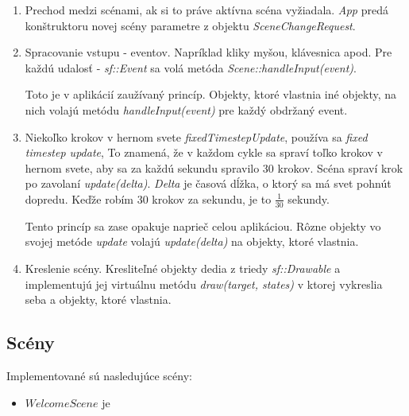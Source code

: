 \documentclass[12pt]{article}
\begin{document}
\begin{enumerate}
    \item Prechod medzi scénami, ak si to práve aktívna scéna vyžiadala. \emph{App} predá
    konštruktoru novej scény parametre z objektu \emph{SceneChangeRequest}.
    \item Spracovanie vstupu - eventov. Napríklad kliky myšou, klávesnica apod.
    Pre každú udalosť - \emph{sf::Event} sa volá metóda \emph{Scene::handleInput(event)}.
    

    Toto je v aplikácií zaužívaný princíp. Objekty, ktoré vlastnia iné objekty,
    na nich volajú metódu \emph{handleInput(event)} pre každý obdržaný event.
    \item Niekoľko krokov v hernom svete \emph{fixedTimestepUpdate}, používa sa \emph{fixed timestep update},
    To znamená, že v každom cykle sa spraví toľko krokov v hernom svete, aby sa za každú sekundu spravilo 30 krokov.
    Scéna spraví krok po zavolaní \emph{update(delta)}. \emph{Delta} je časová dĺžka,
    o ktorý sa má svet pohnút dopredu. Keďže robím 30 krokov za sekundu, je to $\frac{1}{30}$ sekundy.
    
    
    Tento princíp sa zase opakuje naprieč celou aplikáciou. Rôzne objekty vo svojej metóde
    \emph{update} volajú \emph{update(delta)} na objekty, ktoré vlastnia.
    \item Kreslenie scény. Kresliteľné objekty dedia z triedy \emph{sf::Drawable} a implementujú
    jej virtuálnu metódu \emph{draw(target, states)} v ktorej vykreslia seba a objekty, ktoré vlastnia.
\end{enumerate}

\subsection{Scény}
Implementované sú nasledujúce scény:
\begin{itemize}
    \item $WelcomeScene$ je 
\end{itemize}
\end{document}
